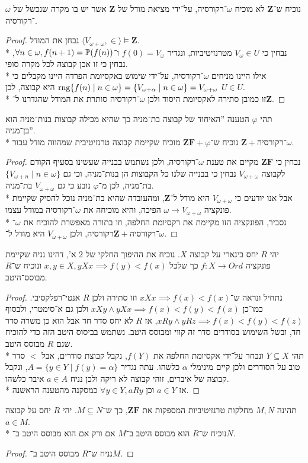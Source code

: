 \Subquestion{}
נוכיח ש־$\textbf{Z}$ לא מוכיח $\omega$־רקורסיה, על־ידי מציאת מודל של $\textbf{Z}$ אשר יש בו מקרה שנכשל של $\omega$־רקורסיה.
\begin{proof}
	נבחן את המודל $\langle V_{\omega + \omega}, \in \rangle \models \textbf{Z}$. \\*
	נבחין כי $V_\omega \in U$ מטרנזיטיביות, ונגדיר $f(0) = V_\omega$ ו־$\forall n \in \omega, f(n + 1) = \mathbb{P}(f(n))$, נבחין כי זו אכן קבוצה לכל מקרה סופי. \\*
	אילו היינו מניחים $\omega$־רקורסיה, על־ידי שימוש באקסיומת הפרדה היינו מקבלים כי $\operatorname{rng}\{ f(n) \mid n \in \omega\} = \{ V_{\omega + \alpha} \mid n \in \omega \} = V_{\omega + \omega}$ היא קבוצה, לכן $U \in U$. \\*
	זו כמובן סתירה לאקסיומת היסוד ולכן $\omega$־רקורסיה סותרת את המודל שהגדרנו ל־$\textbf{Z}$.
\end{proof}

\Subquestion{}
תהי $\varphi$ הטענה ''האיחוד של קבוצה בת־מניה כך שהיא מכילה קבוצות בנות־מניה הוא בן־מניה''. \\*
נוכיח ש־$\textbf{ZF} + \varphi$ מוכיח שקיימת קבוצה טרנזיטיבית שמהווה מודל עבור $\textbf{Z} + \text{־רקורסיה}\omega$.
\begin{proof}
	נבחין כי $\textbf{ZF}$ מקיים את טענת $\omega$־רקורסיה, ולכן נשתמש בבנייה שעשינו בסעיף הקודם לקבוצה $V_{\omega + \omega}$ נבחין כי בבנייה שלנו כל הקבוצות הן בנות־מניה,
	וכי גם $\{ V_{\omega + n} \mid n \in \omega \}$ בת־מניה, לכן מ־$\varphi$ נובע כי גם $V_{\omega + \omega}$ בת־מניה. \\*
	אבל אנו יודעים כי $V_{\omega + \omega}$ היא מודל ל־$\textbf{Z}$, ומהעובדה שהיא בת־מניה נוכל להסיק שקיימת פונקציה $\omega \to V_{\omega + \omega}$ הפיכה, והיא מוכיחה את $\omega$־רקורסיה במודל עצמו. \\*
	נסביר, הפונקציה הזו מקיימת את רקסיומת החלפה, וזו בתורה מאפשרת להוכיח את $\omega$־רקורסיה, ולכן $V_{\omega + \omega}$ היא מודל ל־$\textbf{Z} + \text{־רקורסיה}\omega$.
\end{proof}

\Question{}
\Subquestion{}
יהי $R$ יחס בינארי על קבוצה $X$.
נוכיח את ההיפוך החלקי של 2 א', דהינו נניח שקיימת פונקציה $f : X \to Ord$ כך שלכל $x, y \in X, y X x \implies f(y) < f(x)$ ונוכיח ש־$R$ מבוסס־היטב.
\begin{proof}
	נתחיל ונראה ש־$x X x \implies f(x) < f(x)$ וזו סתירה ולכן $R$ אנטי־רפלקסיבי. כמו־כן $x X y \land y X x \implies f(x) < f(y) < f(x)$ ולכן גם א־סימטרי, ולבסוף $x R y \land y R z \implies f(x) < f(y) < f(z)$,
	 אז $R$ לא יחס סדר חד אבל הוא כן משרה סדר חד, ובשל השימוש בסודרים סדר זה קווי ומבוסס היטב.
	 נשתמש בביסוס היטב הזה כדי להוכיח שגם $R$ מבוסס היטב. \\*
	 תהי $Y \subseteq X$ ונבחר על־ידי אקסיומת החלפה את $f(Y)$, נקבל קבוצת סודרים, אבל $<$ סדר טוב על הסודרים ולכן קיים מינימלי $\alpha$ כלשהו.
	 עתה נגדיר $A = \{ y \in Y \mid f(y) = \alpha \}$, ונקבל קבוצה של איברים, זוהי קבוצה לא ריקה ולכן נניח $a \in A$ איבר כלשהו. \\*
	 אז $a \in Y$ וכן $\forall y \in Y, a R y$ כמסקנה מהטענה הראשנה.
\end{proof}

\Subquestion{}
תהינה $M, N$ מחלקות טרנזיטיביות המספקות את $\textbf{ZF}$, כך ש־$M \subseteq N$.
יהי $R$ יחס על קבוצה $a \in M$. \\*
נוכיח ש־$R$ הוא מבוסס היטב ב־$M$ אם ורק אם הוא מבוסס היטב ב־$N$.
\begin{proof}
	נניח ש־$R$ מבוסס היטב ב־$M$.
\end{proof}


